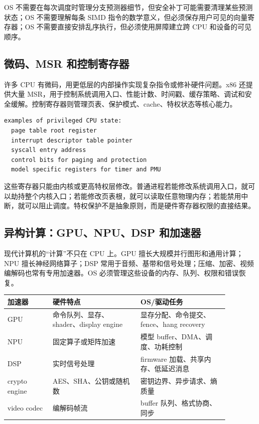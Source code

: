 OS 不需要在每次调度时管理分支预测器细节，但安全补丁可能需要清理某些预测状态；OS 不需要理解每条 SIMD 指令的数学意义，但必须保存用户可见的向量寄存器；OS 不需要直接安排乱序执行，但必须使用屏障建立跨 CPU 和设备的可见顺序。

\subsection{微码、MSR 和控制寄存器}

许多 CPU 有微码，用更低层的内部操作实现复杂指令或修补硬件问题。x86 还提供大量 MSR，用于控制系统调用入口、性能计数、时间戳、缓存策略、调试和安全缓解。控制寄存器则管理页表、保护模式、cache、特权状态等核心能力。

\begin{lstlisting}
examples of privileged CPU state:
  page table root register
  interrupt descriptor table pointer
  syscall entry address
  control bits for paging and protection
  model specific registers for timer and PMU
\end{lstlisting}

这些寄存器只能由内核或更高特权层修改。普通进程若能修改系统调用入口，就可以劫持整个内核入口；若能修改页表根，就可以读取任意物理内存；若能禁用中断，就可以阻止调度。特权保护不是抽象原则，而是硬件寄存器权限的直接结果。

\subsection{异构计算：GPU、NPU、DSP 和加速器}

现代计算机的“计算”不只在 CPU 上。GPU 擅长大规模并行图形和通用计算；NPU 擅长神经网络算子；DSP 常用于音频、基带和信号处理；压缩、加密、视频编解码也常有专用加速器。OS 必须管理这些设备的内存、队列、权限和错误恢复。

\begin{longtable}{p{0.18\linewidth}p{0.35\linewidth}p{0.35\linewidth}}
\toprule
加速器 & 硬件特点 & OS/驱动任务 \\
\midrule
GPU & 命令队列、显存、shader、display engine & 显存分配、命令提交、fence、hang recovery \\
NPU & 固定算子或矩阵加速 & 模型 buffer、DMA、调度、功耗控制 \\
DSP & 实时信号处理 & firmware 加载、共享内存、低延迟消息 \\
crypto engine & AES、SHA、公钥或随机数 & 密钥边界、异步请求、熵质量 \\
video codec & 编解码帧流 & buffer 队列、格式协商、同步 \\
\bottomrule
\end{longtable}

